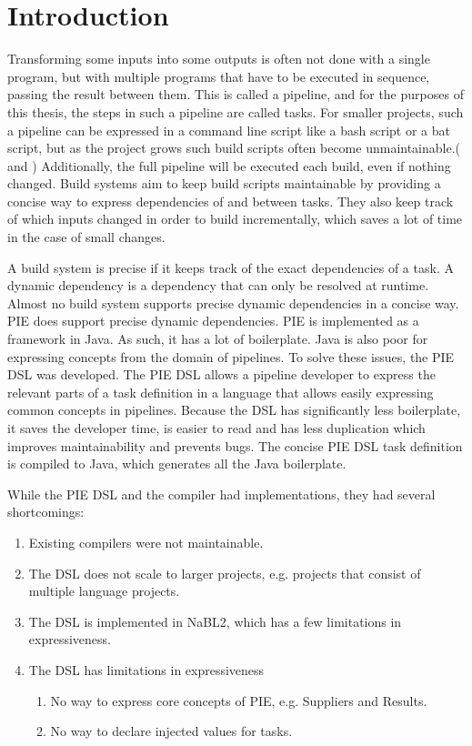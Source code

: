 
\section{Introduction}
\label{sec:introduction}

Transforming some inputs into some outputs is often not done with a single program, but with multiple programs that have to be executed in sequence, passing the result between them.
This is called a pipeline, and for the purposes of this thesis, the steps in such a pipeline are called tasks.
For smaller projects, such a pipeline can be expressed in a command line script like a bash script or a bat script, but as the project grows such build scripts often become unmaintainable.(\cite{Hatch2018} and \cite{Moodie2006})
Additionally, the full pipeline will be executed each build, even if nothing changed.
Build systems aim to keep build scripts maintainable by providing a concise way to express dependencies of and between tasks.
They also keep track of which inputs changed in order to build incrementally, which saves a lot of time in the case of small changes.

A build system is precise if it keeps track of the exact dependencies of a task.
A dynamic dependency is a dependency that can only be resolved at runtime.
Almost no build system supports precise dynamic dependencies in a concise way.
PIE does support precise dynamic dependencies.
PIE is implemented as a framework in Java.
As such, it has a lot of boilerplate.
Java is also poor for expressing concepts from the domain of pipelines.
To solve these issues, the PIE DSL was developed.
The PIE DSL allows a pipeline developer to express the relevant parts of a task definition in a language that allows easily expressing common concepts in pipelines.
Because the DSL has significantly less boilerplate, it saves the developer time, is easier to read and has less duplication which improves maintainability and prevents bugs. 
The concise PIE DSL task definition is compiled to Java, which generates all the Java boilerplate.

While the PIE DSL and the compiler had implementations, they had several shortcomings:
\begin{enumerate}
  \item Existing compilers were not maintainable.
  \item The DSL does not scale to larger projects, e.g. projects that consist of multiple language projects.
  \item The DSL is implemented in NaBL2, which has a few limitations in expressiveness.
  \item The DSL has limitations in expressiveness
  \begin{enumerate}
    \item No way to express core concepts of PIE, e.g. Suppliers and Results.
    \item No way to declare injected values for tasks.
  \end{enumerate}
\end{enumerate}


